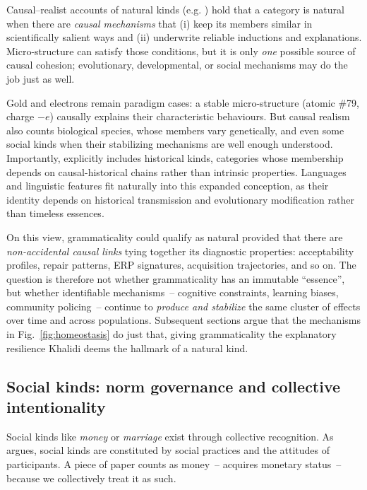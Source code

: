 \documentclass[12pt]{article}
\begin{document}
Causal–realist accounts of natural kinds (e.g. \textcite{Khalidi2013}) hold that a category is natural when there are \emph{causal mechanisms} that (i) keep its members similar in scientifically salient ways and (ii) underwrite reliable inductions and explanations. Micro-structure can satisfy those conditions, but it is only \emph{one} possible source of causal cohesion; evolutionary, developmental, or social mechanisms may do the job just as well.

Gold and electrons remain paradigm cases: a stable micro-structure (atomic \#79, charge $-e$) causally explains their characteristic behaviours. But causal realism also counts biological species, whose members vary genetically, and even some social kinds when their stabilizing mechanisms are well enough understood. Importantly, \textcite{Khalidi2013} explicitly includes historical kinds, categories whose membership depends on causal-historical chains rather than intrinsic properties. Languages and linguistic features fit naturally into this expanded conception, as their identity depends on historical transmission and evolutionary modification rather than timeless essences.

On this view, grammaticality could qualify as natural provided that there are \emph{non-accidental causal links} tying together its diagnostic properties: acceptability profiles, repair patterns, ERP signatures, acquisition trajectories, and so on. The question is therefore not whether grammaticality has an immutable \enquote{essence}, but whether identifiable mechanisms~-- cognitive constraints, learning biases, community policing~-- continue to \emph{produce and stabilize} the same cluster of effects over time and across populations. Subsequent sections argue that the mechanisms in Fig.~\ref{fig:homeostasis} do just that, giving grammaticality the explanatory resilience Khalidi deems the hallmark of a natural kind.

\subsection{Social kinds: norm governance and collective intentionality}

Social kinds like \textit{money} or \textit{marriage} exist through collective recognition. As \textcite{Haslanger2012} argues, social kinds are constituted by social practices and the attitudes of participants. A piece of paper counts as money~-- acquires monetary status~-- because we collectively treat it as such.
\end{document}
